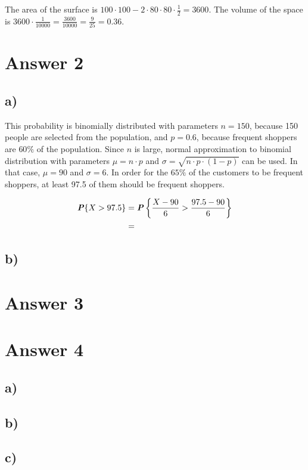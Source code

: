 \documentclass[12pt]{article}
\newcommand{\boldP}{\textbf{\textit{P}}}
\begin{document}
\noindent
The area of the surface is $100 \cdot 100 - 2 \cdot 80 \cdot 80 \cdot
\frac{1}{2} = 3600$. The volume of the space is $3600 \cdot \frac{1}{10000} =
\frac{3600}{10000} = \frac{9}{25} = 0.36$.

\newpage

\section*{Answer 2}

\subsection*{a)}

This probability is binomially distributed with parameters $n = 150$, because
150 people are selected from the population, and $p = 0.6$, because frequent
shoppers are $60\%$ of the population. Since $n$ is large, normal approximation
to binomial distribution with parameters $\mu = n \cdot p$ and $\sigma = \sqrt{n
\cdot p \cdot (1 - p)}$ can be used. In that case, $\mu = 90$ and $\sigma = 6$.
In order for the $65\%$ of the customers to be frequent shoppers, at least 97.5
of them should be frequent shoppers.

\begin{align*}
  \boldP\{X > 97.5\}
    &= \boldP \left\{ \frac{X - 90}{6} > \frac{97.5 - 90}{6} \right\} \\
    &=
\end{align*}

\subsection*{b)} 


\section*{Answer 3}


\section*{Answer 4}

\subsection*{a)} 

\subsection*{b)} 

\subsection*{c)} 
\end{document}
